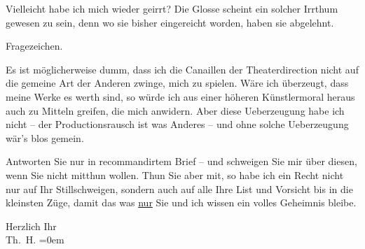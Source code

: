 \pstart
           Vielleicht habe ich mich wieder geirrt? Die Glosse scheint ein solcher Irrthum gewesen zu sein, denn \label{K_L03835-1v}\label{K_L03835-1} wo sie bisher eingereicht worden,
               haben sie abgelehnt.\pend
           
\pstart
           Fragezeichen.\pend
           
\pstart
           Es ist möglicherweise dumm, dass ich die Canaillen der Theaterdirection nicht auf die
               gemeine Art der Anderen zwinge, mich zu spielen. Wäre ich überzeugt, dass meine Werke
               es werth sind, so würde ich aus einer höheren Künstlermoral heraus auch zu Mitteln
               greifen, die mich anwidern. Aber diese Ueberzeugung habe ich nicht – der
               Productionsrausch ist was Anderes – und ohne solche Ueberzeugung wär’s blos
               gemein.\pend
           
\pstart
           Antworten Sie nur in recommandirtem Brief – und schweigen Sie mir über diesen, wenn
               Sie nicht mitthun wollen. Thun Sie aber mit, so habe ich ein Recht nicht nur auf Ihr
               Stillschweigen, sondern auch auf alle Ihre List und Vorsicht bis in die kleinsten
               Züge, damit das was \uline{nur} Sie und ich wissen ein volles
               Geheimnis bleibe.\pend
           
\pstart
           Herzlich Ihr{\\[\baselineskip]}\spacefill\mbox{Th. H.}\pend
           \leftskip=0em{}\endnumbering{}
\begin{anhang}
\end{anhang}\newcommand{\dateiname}{L03835}\newcommand{\titel}{Theodor Herzl an Arthur Schnitzler, 8. 11. 1894}\newcommand{\editorInnen}{Selma Jahnke und Martin Anton Müller}
